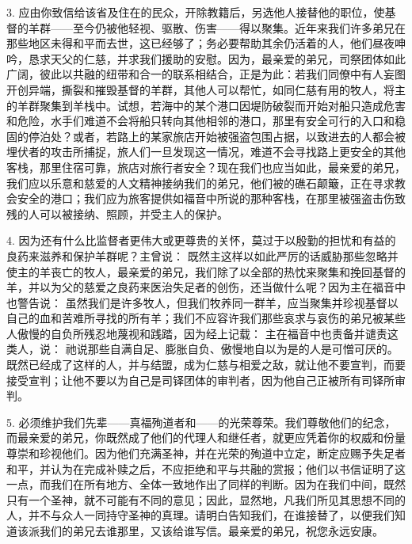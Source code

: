 3. 应由你致信给该省及住在的民众，开除教籍后，另选他人接替他的职位，使基督的羊群——至今仍被他轻视、驱散、伤害——得以聚集。近年来我们许多弟兄在那些地区未得和平而去世，这已经够了；务必要帮助其余仍活着的人，他们昼夜呻吟，恳求天父的仁慈，并求我们援助的安慰。因为，最亲爱的弟兄，司祭团体如此广阔，彼此以共融的纽带和合一的联系相结合，正是为此：若我们同僚中有人妄图开创异端，撕裂和摧毁基督的羊群，其他人可以帮忙，如同仁慈有用的牧人，将主的羊群聚集到羊栈中。试想，若海中的某个港口因堤防破裂而开始对船只造成危害和危险，水手们难道不会将船只转向其他相邻的港口，那里有安全可行的入口和稳固的停泊处？或者，若路上的某家旅店开始被强盗包围占据，以致进去的人都会被埋伏者的攻击所捕捉，旅人们一旦发现这一情况，难道不会寻找路上更安全的其他客栈，那里住宿可靠，旅店对旅行者安全？现在我们也应当如此，最亲爱的弟兄，我们应以乐意和慈爱的人文精神接纳我们的弟兄，他们被的礁石颠簸，正在寻求教会安全的港口；我们应为旅客提供如福音中所说的那种客栈，在那里被强盗击伤致残的人可以被接纳、照顾，并受主人的保护。\par

4. 因为还有什么比监督者更伟大或更尊贵的关怀，莫过于以殷勤的担忧和有益的良药来滋养和保护羊群呢？主曾说： 既然主这样以如此严厉的话威胁那些忽略并使主的羊丧亡的牧人，最亲爱的弟兄，我们除了以全部的热忱来聚集和挽回基督的羊，并以为父的慈爱之良药来医治失足者的创伤，还当做什么呢？因为主在福音中也警告说：  虽然我们是许多牧人，但我们牧养同一群羊，应当聚集并珍视基督以自己的血和苦难所寻找的所有羊；我们不应容许我们那些哀求与哀伤的弟兄被某些人傲慢的自负所残忍地蔑视和践踏，因为经上记载：  主在福音中也责备并谴责这类人，说：  祂说那些自满自足、膨胀自负、傲慢地自以为是的人是可憎可厌的。既然已经成了这样的人，并与结盟，成为仁慈与相爱之敌，就让他不要宣判，而要接受宣判；让他不要以为自己是司铎团体的审判者，因为他自己正被所有司铎所审判。\par

5. 必须维护我们先辈——真福殉道者和——的光荣尊荣。我们尊敬他们的纪念，而最亲爱的弟兄，你既然成了他们的代理人和继任者，就更应凭着你的权威和份量尊崇和珍视他们。因为他们充满圣神，并在光荣的殉道中立定，断定应赐予失足者和平，并认为在完成补赎之后，不应拒绝和平与共融的赏报；他们以书信证明了这一点，而我们在所有地方、全体一致地作出了同样的判断。因为在我们中间，既然只有一个圣神，就不可能有不同的意见；因此，显然地，凡我们所见其思想不同的人，并不与众人一同持守圣神的真理。请明白告知我们，在谁接替了，以便我们知道该派我们的弟兄去谁那里，又该给谁写信。最亲爱的弟兄，祝您永远安康。\par

